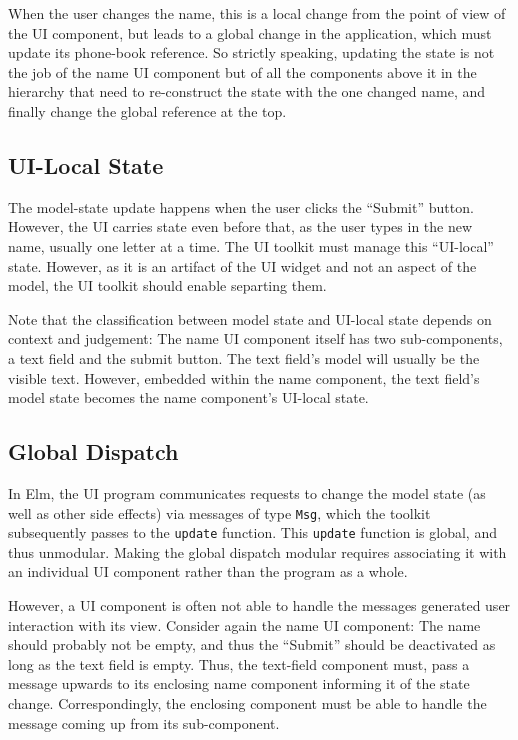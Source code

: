 \documentclass[sigplan,screen]{acmart}
\begin{document}
When the user changes the name, this is a local change from the point
of view of the UI component, but leads to a global change in the
application, which must update its phone-book reference.  So strictly
speaking, updating the state is not the job of the name UI component
but of all the components above it in the hierarchy that need to
re-construct the state with the one changed name, and finally change
the global reference at the top.

\subsection{UI-Local State}

The model-state update happens when the user clicks the ``Submit''
button.  However, the UI carries state even before that, as the user
types in the new name, usually one letter at a time.  The UI toolkit
must manage this ``UI-local'' state.  However, as it is an artifact of
the UI widget and not an aspect of the model, the UI toolkit should
enable separting them.

Note that the classification between model state and UI-local state
depends on context and judgement: The name UI component itself has two
sub-components, a text field and the submit button.  The text field's
model will usually be the visible text.  However, embedded within the
name component, the text field's model state becomes the name
component's UI-local state.

\subsection{Global Dispatch}

In Elm, the UI program communicates requests to change the model state
(as well as other side effects) via messages of type \texttt{Msg},
which the toolkit subsequently passes to the \texttt{update} function.
This \texttt{update} function is global, and thus unmodular.  Making
the global dispatch modular requires associating it with an individual
UI component rather than the program as a whole.

However, a UI component is often not able to handle the messages
generated user interaction with its view.  Consider again the name UI
component: The name should probably not be empty, and thus the
``Submit'' should be deactivated as long as the text field is empty.
Thus, the text-field component must, pass a message upwards to its
enclosing name component informing it of the state change.
Correspondingly, the enclosing component must be able to handle the
message coming up from its sub-component.
\end{document}
